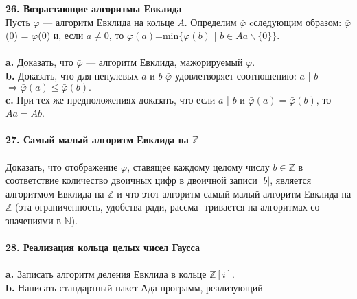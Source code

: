 \documentclass{mai_book}
\begin{document}
\noindent\textbf{26. Возрастающие алгоритмы Евклида}\\
\hspace*{10pt} Пусть $\varphi$ — алгоритм Евклида на кольце $A$. Определим $\bar{ \varphi}$  cследующим\linebreak
образом: $\bar{ \varphi}$(0) = $\varphi$(0) и, если $a\neq0$, то $\bar{ \varphi}(a)$=min$\{ \varphi(b)$ | $b \in Aa \backslash \{0\} \}.$\\\\
\hspace*{10pt}\textbf{a.} Доказать, что $\bar{ \varphi}$ — алгоритм Евклида, мажорируемый  $\varphi$.
\\
\hspace*{10pt}\textbf{b.} Доказать, что для ненулевых $a$ и $b$ $\bar{ \varphi}$ удовлетворяет соотношению:\linebreak
$a$ | $b$ $\Rightarrow \bar{ \varphi}(a) \leq \bar{ \varphi}(b).$\\
\hspace*{10pt}\textbf{c.} При тех же предположениях доказать, что если $a$ | $b$ и \linebreak $\bar{ \varphi}(a) = \bar{ \varphi}(b)$, то $Aa=Ab$.\\
\\
\noindent\textbf{27. Самый малый алгоритм Евклида на $\mathbb{Z}$}\\\\
\hspace*{10pt} Доказать, что отображение $\varphi$, ставящее каждому целому числу $b \in\mathbb{Z}$ \linebreak
в соответствие количество двоичных цифр в двоичной записи $|b|$,\linebreak
является алгоритмом Евклида на $\mathbb{Z}$ и что этот алгоритм самый малый\linebreak
алгоритм Евклида на $\mathbb{Z}$ (эта ограниченность, удобства ради, рассма-\linebreak
тривается на алгоритмах со значениями в $\mathbb{N}$).
\\
\\
\noindent\textbf{28. Реализация кольца целых чисел Гаусса}\\\\
\hspace*{10pt}\textbf{a.} Записать алгоритм деления Евклида в кольце $\mathbb{Z}[i]$.\\
\hspace*{10pt}\textbf{b.} Написать стандартный пакет Ада-программ, реализующий\linebreak
\end{document}
